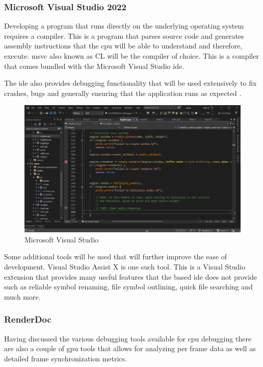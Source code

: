 \documentclass[11pt]{article}
\begin{document}
\subsubsection{Microsoft Visual Studio 2022}
Developing a program that runs directly on the underlying operating system
requires a compiler. This is a program that parses source code and generates
assembly instructions that the \gls{cpu} will be able to understand and
therefore, execute. \gls{msvc} also known as CL will be the compiler of choice.
This is a compiler that comes bundled with the Microsoft Visual Studio
\gls{ide}.

The \gls{ide} also provides debugging functionality that will be used
extensively to fix crashes, bugs and generally ensuring that the application
runs as expected \cite{visualstudio}. 

\begin{figure}[h!]
  \centering
  \includegraphics[width=\textwidth]{images/visual_studio.png}
  \caption{Microsoft Visual Studio}
  \label{fig:visual_studio}
\end{figure}

Some additional tools will be used that will further improve the ease of
development.  Visual Studio Assist X \cite{visualstudioassistx} is one such
tool. This is a Visual Studio extension that provides many useful features that
the based \gls{ide} does not provide such as reliable symbol renaming, file symbol
outlining, quick file searching and much more.


\subsubsection{RenderDoc}
Having discussed the various debugging tools available for \gls{cpu} debugging
there are also a couple of \gls{gpu} tools that allows for analyzing per frame
data as well as detailed frame synchronization metrics.
\end{document}
